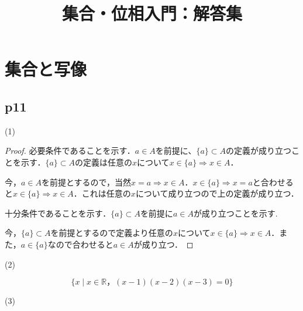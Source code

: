 \documentclass[dvipdfmx,uplatex,11pt]{jsarticle}
\title{集合・位相入門：解答集}
\author{}
\begin{document}
\maketitle
\section{集合と写像}
\subsection{p11}
(1)
\begin{leftbar}
\begin{proof}
必要条件であることを示す．$a \in A$を前提に、$\{ a\} \subset A$の定義が成り立つことを示す．$\{ a \} \subset A$の定義は任意の$x$について$x \in \{a\} \Rightarrow x  \in A$． \par
今，$a \in A$を前提とするので，当然$x=a \Rightarrow x \in A$．$x \in  \{a\} \Rightarrow x=a$と合わせると$x \in \{a\} \Rightarrow x \in A$．これは任意の$x$について成り立つので上の定義が成り立つ．\par
十分条件であることを示す．$\{a\} \subset A$を前提に$a \in A$が成り立つことを示す.\par
今，$\{a\} \subset A$を前提とするので定義より任意の$x$について$x \in \{a\} \Rightarrow x \in A$．また，$a \in \{a\}$なので合わせると$a \in A$が成り立つ．
\end{proof}
\end{leftbar}
(2)
\begin{leftbar}
    \[
        \{x \mid x \in \mathbb{R}， (x-1)(x-2)(x-3)=0\}
    \]
\end{leftbar}
(3)
\end{document}
